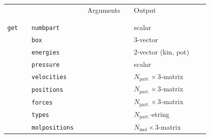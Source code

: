 \documentclass[11pt]{article}
\begin{document}
\clearpage
\begin{center}
  
  \begin{tabular}{cclclclll}
    {\color{red}{\textbf{Action}}} && {\color{blue}{Specifier}} && Arguments && Output \\
                                   && && && \\
    \hline
                                   && && && \\
    \verb!get! && \verb!numbpart!&& && scalar\\
               && \verb!box! && && 3-vector \\
               && \verb!energies! && && 2-vector (kin, pot)\\
               && \verb!pressure! && && scalar \\
               && \verb!velocities! && && $N_\mathrm{part.}\times 3$-matrix \\
               && \verb!positions! && &&  $N_\mathrm{part.}\times 3$-matrix \\
               && \verb!forces! && &&  $N_\mathrm{part.}\times 3$-matrix \\
               && \verb!types! && && $N_\mathrm{part.}$-string \\
               && \verb!molpositions! && && $N_\mathrm{mol}\times 3$-matrix \\
    

\end{tabular}
\end{center}
\end{document}
